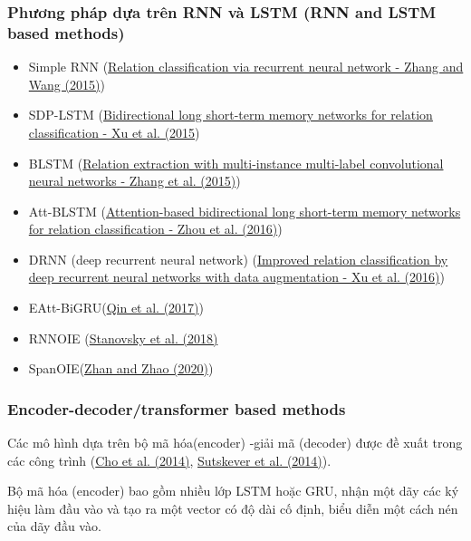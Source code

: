 \subsubsection{Phương pháp dựa trên RNN và LSTM (RNN and LSTM based methods)}
\begin{itemize}
    \item Simple RNN (\href{https://arxiv.org/abs/1508.01006}{Relation classification via recurrent neural network - Zhang and Wang (2015)})
    \item SDP-LSTM (\href{https://aclanthology.org/D15-1206}{Bidirectional long short-term memory networks for relation classification - Xu et al. (2015})
    \item BLSTM (\href{https://aclanthology.org/C16-1139}{Relation extraction with multi-instance multi-label convolutional neural networks - Zhang et al. (2015)})
    \item Att-BLSTM (\href{https://aclanthology.org/P16-2034}{Attention-based bidirectional long short-term memory networks for relation classification - Zhou et al. (2016)})
    \item DRNN (deep recurrent neural network) (\href{https://aclanthology.org/C16-1138}{Improved relation classification by deep recurrent neural networks with data augmentation - Xu et al. (2016)})
    \item EAtt-BiGRU(\href{https://doi.org/10.1109/IJCNN.2017.7966407}{Qin et al. (2017)})
    \item RNNOIE (\href{https://aclanthology.org/N18-1081}{Stanovsky et al. (2018)}
    \item SpanOIE(\href{https://www.scopus.com/inward/record.url?eid=2-s2.0-85106555459&partnerID=10&rel=R3.0.0}{Zhan and Zhao (2020)})
\end{itemize}

\newpage
\subsubsection{Encoder-decoder/transformer based methods}
\begin{singlespace}
    Các mô hình dựa trên bộ mã hóa(encoder) -giải mã (decoder) được đề xuất trong các công trình
    (\href{https://www.sciencedirect.com/science/article/pii/S2667305323000698#br0250}{Cho et al. (2014)}, \href{https://www.sciencedirect.com/science/article/pii/S2667305323000698#br1350}{Sutskever et al. (2014)}).
\end{singlespace}

\begin{singlespace}
    Bộ mã hóa (encoder) bao gồm nhiều lớp LSTM hoặc GRU, nhận một dãy các ký hiệu làm đầu vào và tạo ra một vector có độ dài cố định,
    biểu diễn một cách nén của dãy đầu vào.
\end{singlespace}

